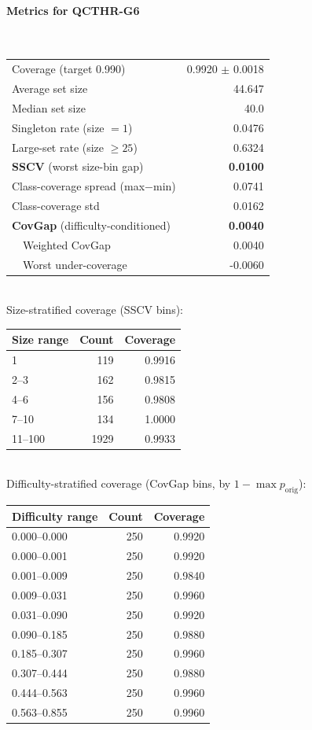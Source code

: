 \documentclass[parskip=half]{scrartcl}
\begin{document}
\paragraph{Metrics for QCTHR-G6}~\\
\begin{tabular}{l r}
\hline
Coverage (target 0.990) & 0.9920 $\pm$ 0.0018 \\
Average set size & 44.647 \\
Median set size & 40.0 \\
Singleton rate (size $=1$) & 0.0476 \\
Large-set rate (size $\geq 25$) & 0.6324 \\
\textbf{SSCV} (worst size-bin gap) & \textbf{0.0100} \\
Class-coverage spread (max$-$min) & 0.0741 \\
Class-coverage std & 0.0162 \\
\textbf{CovGap} (difficulty-conditioned) & \textbf{0.0040} \\
~~Weighted CovGap & 0.0040 \\
~~Worst under-coverage & -0.0060 \\
\hline
\end{tabular}\\[0.5em]
\textsf{\scriptsize Size-stratified coverage (SSCV bins):}\\
\begin{tabular}{l r r}
\hline
Size range & Count & Coverage \\
\hline
1 & 119 & 0.9916 \\
2--3 & 162 & 0.9815 \\
4--6 & 156 & 0.9808 \\
7--10 & 134 & 1.0000 \\
11--100 & 1929 & 0.9933 \\
\hline
\end{tabular}\\[0.5em]
\textsf{\scriptsize Difficulty-stratified coverage (CovGap bins, by $1-\max p_{\mathrm{orig}}$):}\\
\begin{tabular}{l r r}
\hline
Difficulty range & Count & Coverage \\
\hline
0.000--0.000 & 250 & 0.9920 \\
0.000--0.001 & 250 & 0.9920 \\
0.001--0.009 & 250 & 0.9840 \\
0.009--0.031 & 250 & 0.9960 \\
0.031--0.090 & 250 & 0.9920 \\
0.090--0.185 & 250 & 0.9880 \\
0.185--0.307 & 250 & 0.9960 \\
0.307--0.444 & 250 & 0.9880 \\
0.444--0.563 & 250 & 0.9960 \\
0.563--0.855 & 250 & 0.9960 \\
\hline
\end{tabular}\\[0.5em]
\end{document}

